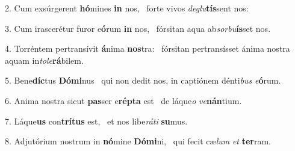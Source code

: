 2. Cum exsúrgerent \textbf{hó}mines \textbf{in} nos, \ast\  forte vivos \textit{de}\textit{glu}\textbf{tís}sent nos:\

3. Cum irascerétur furor e\textbf{ó}rum \textbf{in} nos, \ast\  fórsitan aqua ab\textit{sor}\textit{bu}\textbf{ís}set nos.\

4. Torréntem pertransívit \textbf{á}nima \textbf{nos}tra: \ast\  fórsitan pertransísset ánima nostra aquam in\textit{to}\textit{le}\textbf{rá}bilem.\

5. Bene\textbf{díc}tus \textbf{Dó}\textbf{mi}nus \ast\  qui non dedit nos, in captiónem dénti\textit{bus} \textit{e}\textbf{ó}rum.\

6. Anima nostra sicut \textbf{pas}ser e\textbf{rép}\textbf{ta} est \ast\  de láque\textit{o} \textit{ve}\textbf{nán}tium.\

7. Láque\textbf{us} con\textbf{trí}\textbf{tus} est, \ast\  et nos libe\textit{rá}\textit{ti} \textbf{su}mus.\

8. Adjutórium nostrum in \textbf{nó}mine \textbf{Dó}\textbf{mi}ni, \ast\  qui fecit cæ\textit{lum} \textit{et} \textbf{ter}ram.\

